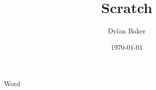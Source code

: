 \documentclass[12pt]{article}
\title{Scratch}
\author{Dylan Baker}
\date{\today}
\begin{document}
\maketitle

\newpage




Word
\end{document}
